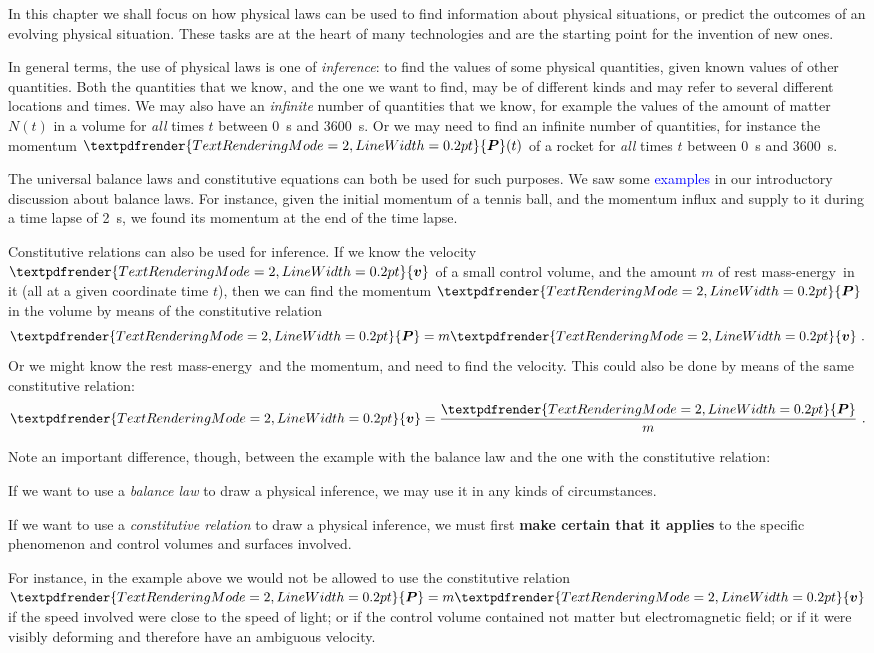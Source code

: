 \documentclass[a4paper,12pt,%
onecolumn,oneside,%
british%
]{memoir}
\renewcommand*{\bm}[1]{\textpdfrender{TextRenderingMode=2,LineWidth=0.2pt}{\boldsymbol{#1}}}
\renewcommand*{\|}[1][]{\nonscript\:#1\vert\nonscript\:\mathopen{}}
\newcommand*{\sect}{\S}%
\renewcommand*{\autoref}[3][\sect\,\ref]{\textcolor{blue}{#3}
\raisebox{0.6ex}{\color{blue}\miniscule%
\faIcon{angle-right}%
\;#1{#2}\;p.\,\pageref{#2}}}
\newcommand*{\masse}{mass-energy}
\newcommand*{\yv}{\bm{v}}
\newcommand*{\yN}{N}
\newcommand*{\ym}{m}%
\newcommand*{\yP}{\bm{P}}
\begin{document}
In this chapter we shall focus on how physical laws can be used to find information about physical situations, or predict the outcomes of an evolving physical situation. These tasks are at the heart of many technologies and are the starting point for the invention of new ones.

\medskip

In general terms, the use of physical laws is one of \emph{inference}: to find the values of some physical quantities, given known values of other quantities. Both the quantities that we know, and the one we want to find, may be of different kinds and may refer to several different locations and times. We may also have an \emph{infinite} number of quantities that we know, for example the values of the amount of matter $\yN(t)$ in a volume for \emph{all} times $t$ between \qty{0}{s} and \qty{3600}{s}. Or we may need to find  an infinite number of quantities, for instance the momentum $\yP(t)$ of a rocket for \emph{all} times $t$ between \qty{0}{s} and \qty{3600}{s}.

\medskip

The universal balance laws and constitutive equations can both be used for such purposes. We saw some \autoref{sec:example_balance_vect}{examples} in our introductory discussion about balance laws. For instance, given the initial momentum of a tennis ball, and the momentum influx and supply to it during a time lapse of \qty{2}{s}, we found its momentum at the end of the time lapse.

Constitutive relations can also be used for inference. If we know the velocity $\yv$ of a small control volume, and the amount $\ym$ of rest \masse\ in it (all at a given coordinate time $t$), then we can find the momentum $\yP$ in the volume by means of the constitutive relation
\begin{equation*}
  \yP = \ym\yv \ .
\end{equation*}
Or we might know the rest \masse\ and the momentum, and need to find the velocity. This could also be done by means of the same constitutive relation:
\begin{equation*}
  \yv = \frac{\yP}{\ym} \ .
\end{equation*}

Note an important difference, though, between the example with the balance law and the one with the constitutive relation:
%
\begin{warning}
  If we want to use a \emph{balance law} to draw a physical inference, we may use it in any kinds of circumstances.

  \smallskip

  If we want to use a \emph{constitutive relation} to draw a physical inference, we must first \textbf{make certain that it applies} to the specific phenomenon and control volumes and surfaces involved.
\end{warning}
%
For instance, in the example above we would not be allowed to use the constitutive relation $\yP = \ym\yv$  if the speed involved were close to the speed of light; or if the control volume contained not matter but electromagnetic field; or if it were visibly deforming and therefore have an ambiguous velocity.
\end{document}
